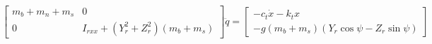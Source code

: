 \documentclass[onecolumn,draftcls]{IEEEtran}
\begin{document}
\begin{equation}
    \begin{bmatrix}
        m_b + m_n + m_s & 0                                             \\
        0               & I_{rxx} + (Y_{r}^{2} + Z_{r}^{2}) (m_b + m_s)
    \end{bmatrix} \ddot{q} =
    \begin{bmatrix}
        - c_{t} \dot{x} - k_{t} x \\
        - g (m_b + m_s) (Y_{r} \cos\psi - Z_{r} \sin\psi)
    \end{bmatrix}
\end{equation}

\newpage

\end{document}
